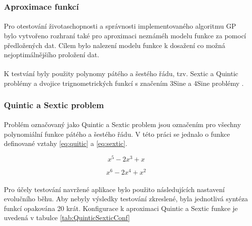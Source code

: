 \documentclass[bc,male,java,dept460]{diploma}		%
\begin{document}
\subsubsection{Aproximace funkcí}
\paragraph*{}
Pro otestování životaschopnosti a správnosti implementovaného algoritmu GP bylo vytvořeno rozhraní také pro aproximaci neznáméh modelu funkce za pomocí předložených dat. Cílem bylo nalezení modelu funkce k dosažení co možná nejoptimálnějšího proložení dat.

\paragraph*{}
K testvání byly použity polynomy pátého a šestého řádu, tzv. Sextic a Quintic problémy a dvojice trignometrických funkcí s značením 3Sine a 4Sine problémy \cite{evolvyptech}.

\subsubsection{Quintic a Sextic problem}
\paragraph*{}
Problém označovaný jako Quintic a Sextic problem jsou označením pro všechny polynomiální funkce pátého a šestého řádu. V této práci se jednalo o funkce definované vztahy \ref{eq:quitic} a \ref{eq:sextic}.

\begin{equation} \label{eq:quitic}
x^5-2x^3+x
\end{equation}

\begin{equation} \label{eq:sextic}
x^6-2x^4+x^2
\end{equation}

\paragraph*{}
Pro účely testování navržené aplikace bylo použito následujících nastavení evolučního běhu. Aby nebyly výsledky testování zkreslené, byla jednotlivá syntéza funkcí opakována 20 krát. Konfigurace k aproximaci Quintic a Sextic funkce je uvedená v tabulce \ref{tab:QuinticSexticConf} 
\end{document}
